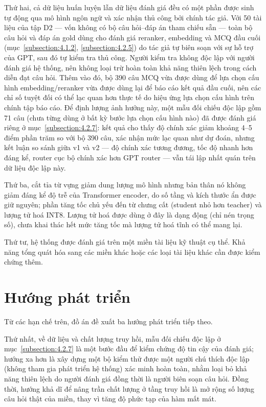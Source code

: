 \documentclass[../DoAn.tex]{subfiles}
\begin{document}
Thứ hai, cả dữ liệu huấn luyện lẫn dữ liệu đánh giá đều có một phần được sinh tự động qua mô hình ngôn ngữ và xác nhận thủ công bởi chính tác giả. Với 50 tài liệu của tập D2 --- vốn không có bộ câu hỏi--đáp án tham chiếu sẵn --- toàn bộ câu hỏi và đáp án gold dùng cho đánh giá reranker, embedding và MCQ đầu cuối (mục~\ref{subsection:4.1.2}, \ref{subsection:4.2.5}) do tác giả tự biên soạn với sự hỗ trợ của GPT, sau đó tự kiểm tra thủ công. Người kiểm tra không độc lập với người đánh giá hệ thống, nên không loại trừ hoàn toàn khả năng thiên lệch trong cách diễn đạt câu hỏi. Thêm vào đó, bộ 390 câu MCQ vừa được dùng để lựa chọn cấu hình embedding/reranker vừa được dùng lại để báo cáo kết quả đầu cuối, nên các chỉ số tuyệt đối có thể lạc quan hơn thực tế do hiệu ứng lựa chọn cấu hình trên chính tập báo cáo. Để định lượng ảnh hưởng này, một mẫu đối chiếu độc lập gồm 71 câu (chưa từng dùng ở bất kỳ bước lựa chọn cấu hình nào) đã được đánh giá riêng ở mục~\ref{subsection:4.2.7}: kết quả cho thấy độ chính xác giảm khoảng 4--5 điểm phần trăm so với bộ 390 câu, xác nhận mức lạc quan như dự đoán, nhưng kết luận so sánh giữa v1 và v2 --- độ chính xác tương đương, tốc độ nhanh hơn đáng kể, router cục bộ chính xác hơn GPT router --- vẫn tái lập nhất quán trên dữ liệu độc lập này.

Thứ ba, cắt tỉa từ vựng giảm dung lượng mô hình nhưng bản thân nó không giảm đáng kể độ trễ của Transformer encoder, do số tầng và kích thước ẩn được giữ nguyên; phần tăng tốc chủ yếu đến từ chưng cất (student nhỏ hơn teacher) và lượng tử hoá INT8. Lượng tử hoá được dùng ở đây là dạng động (chỉ nén trọng số), chưa khai thác hết mức tăng tốc mà lượng tử hoá tĩnh có thể mang lại.

Thứ tư, hệ thống được đánh giá trên một miền tài liệu kỹ thuật cụ thể. Khả năng tổng quát hóa sang các miền khác hoặc các loại tài liệu khác cần được kiểm chứng thêm.

\section{Hướng phát triển}
\label{section:5.4}

Từ các hạn chế trên, đồ án đề xuất ba hướng phát triển tiếp theo.

Thứ nhất, về dữ liệu và chất lượng truy hồi, mẫu đối chiếu độc lập ở mục~\ref{subsection:4.2.7} là một bước đầu để kiểm chứng độ tin cậy của đánh giá; hướng xa hơn là xây dựng một bộ kiểm thử được một người chú thích độc lập (không tham gia phát triển hệ thống) xác minh hoàn toàn, nhằm loại bỏ khả năng thiên lệch do người đánh giá đồng thời là người biên soạn câu hỏi. Đồng thời, hướng khả dĩ để nâng trần chất lượng ở tầng truy hồi là mở rộng số lượng câu hỏi thật của miền, thay vì tăng độ phức tạp của hàm mất mát.
\end{document}
